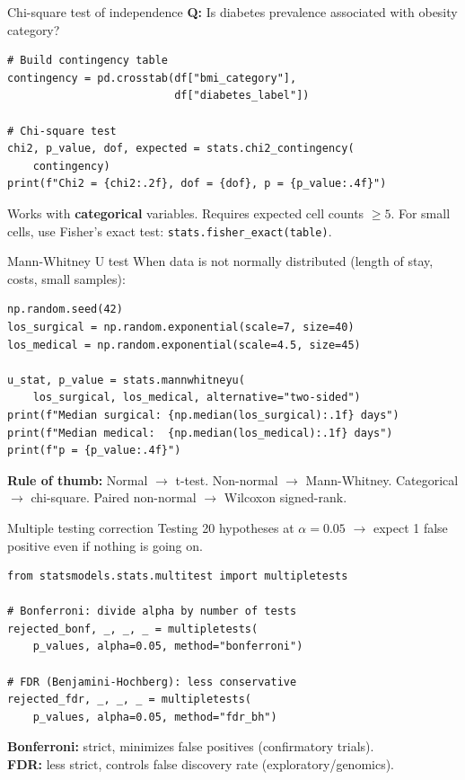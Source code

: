 \documentclass[aspectratio=169,11pt]{beamer}
\begin{document}
\begin{frame}[fragile]{Chi-square test of independence}
\textbf{Q:} Is diabetes prevalence associated with obesity category?

\begin{verbatim}
# Build contingency table
contingency = pd.crosstab(df["bmi_category"],
                          df["diabetes_label"])

# Chi-square test
chi2, p_value, dof, expected = stats.chi2_contingency(
    contingency)
print(f"Chi2 = {chi2:.2f}, dof = {dof}, p = {p_value:.4f}")
\end{verbatim}

Works with \textbf{categorical} variables. Requires expected cell counts $\geq 5$. For small cells, use Fisher's exact test: \texttt{stats.fisher\_exact(table)}.
\end{frame}

\begin{frame}[fragile]{Mann-Whitney U test}
When data is \alert{not normally distributed} (length of stay, costs, small samples):

\begin{verbatim}
np.random.seed(42)
los_surgical = np.random.exponential(scale=7, size=40)
los_medical = np.random.exponential(scale=4.5, size=45)

u_stat, p_value = stats.mannwhitneyu(
    los_surgical, los_medical, alternative="two-sided")
print(f"Median surgical: {np.median(los_surgical):.1f} days")
print(f"Median medical:  {np.median(los_medical):.1f} days")
print(f"p = {p_value:.4f}")
\end{verbatim}

\textbf{Rule of thumb:} Normal $\to$ t-test. Non-normal $\to$ Mann-Whitney. Categorical $\to$ chi-square. Paired non-normal $\to$ Wilcoxon signed-rank.
\end{frame}

\begin{frame}[fragile]{Multiple testing correction}
Testing 20 hypotheses at $\alpha = 0.05$ $\to$ expect 1 false positive even if nothing is going on.

\begin{verbatim}
from statsmodels.stats.multitest import multipletests

# Bonferroni: divide alpha by number of tests
rejected_bonf, _, _, _ = multipletests(
    p_values, alpha=0.05, method="bonferroni")

# FDR (Benjamini-Hochberg): less conservative
rejected_fdr, _, _, _ = multipletests(
    p_values, alpha=0.05, method="fdr_bh")
\end{verbatim}

\textbf{Bonferroni:} strict, minimizes false positives (confirmatory trials).\\
\textbf{FDR:} less strict, controls false discovery rate (exploratory/genomics).
\end{frame}
\end{document}
